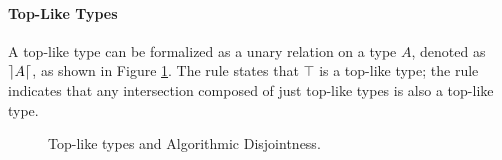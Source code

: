 \paragraph{Top-Like Types}


A top-like type can be formalized as a unary relation on a type $A$, denoted as $\rceil A \lceil$, as shown in 
Figure \ref{fig:tltypesdis}.
The rule  states that $\top$ is a top-like type; 
the rule  indicates that any 
intersection composed of just top-like types is also a top-like type.

\begin{figure}[t]


  \caption{Top-like types and Algorithmic Disjointness.}
  \label{fig:tltypesdis}
\end{figure}




